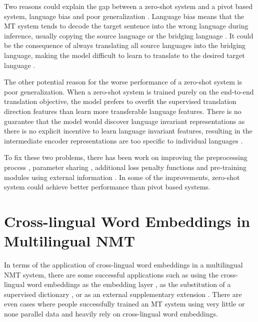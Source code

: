 \documentclass[thesis,fonts=libertine]{cluu}
\begin{document}
Two reasons could explain the gap between a zero-shot system and a pivot based system, language bias \parencite{Ha:2016aa, Ha:2017aa, Arivazhagan:2019aa} and poor generalization \parencite{Arivazhagan:2019aa}. Language bias means that the MT system tends to decode the target sentence into the wrong language during inference, usually copying the source language or the bridging language \parencite{Ha:2016aa}. It could be the consequence of always translating all source languages into the bridging language, making the model difficult to learn to translate to the desired target language \parencite{Arivazhagan:2019aa}.

The other potential reason for the worse performance of a zero-shot system is poor generalization. When a zero-shot system is trained purely on the end-to-end translation objective, the model prefers to overfit the supervised translation direction features than learn more transferable language features. There is no guarantee that the model would discover language invariant representations as there is no explicit incentive to learn language invariant features, resulting in the intermediate encoder representations are too specific to individual languages \parencite{Arivazhagan:2019aa}.

To fix these two problems, there has been work on improving the preprocessing process \parencite{Lakew:2018aa}, parameter sharing \parencite{Firat:2016aa, Blackwood:2018aa}, additional loss penalty functions \parencite{Arivazhagan:2019aa} and pre-training modules using external information \parencite{Baziotis:2020aa}. In some of the improvements, zero-shot system could achieve better performance than pivot based systems.

\section{Cross-lingual Word Embeddings in Multilingual NMT}

In terms of the application of cross-lingual word embeddings in a multilingual NMT system, there are some successful applications such as using the cross-lingual word embeddings as the embedding layer \parencite{neishi-etal-2017-bag, Artetxe:2017aa}, as the substitution of a supervised dictionary \parencite{Conneau:2017aa}, or as an external supplementary extension \parencite{inproceedings}. There are even cases where people successfully trained an MT system using very little or none parallel data \parencite{Conneau:2017aa} and heavily rely on cross-lingual word embeddings. 
\end{document}
